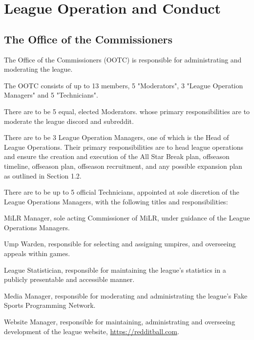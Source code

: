 
\section{League Operation and Conduct}

\subsection{The Office of the Commissioners}
\begin{deepEnumerate}
	\item The Office of the Commissioners (OOTC) is responsible for administrating and moderating the league.
	\item The OOTC consists of up to 13 members, 5 "Moderators", 3 "League Operation Managers" and 5 "Technicians".
	\begin{deepEnumerate}
		\item There are to be 5 equal, elected Moderators. whose primary responsibilities are to moderate the league discord and subreddit.
		\item There are to be 3 League Operation Managers, one of which is the Head of League Operations. Their primary responsibilities are to head league operations
		and ensure the creation and execution of the All Star Break plan, offseason timeline, offseason plan, offseason recruitment, and any possible expansion plan 
		as outlined in Section 1.2.
		\item There are to be up to 5 official Technicians, appointed at sole discretion of the League Operations Managers, with the following titles and responsibilities:
		\begin{deepEnumerate}
			\item MiLR Manager, sole acting Commissioner of MiLR, under guidance of the League Operations Managers.
			\item Ump Warden, responsible for selecting and assigning umpires, and overseeing appeals within games.
			\item League Statistician, responsible for maintaining the league's statistics in a publicly presentable and accessible manner.
			\item Media Manager, responsible for moderating and administrating the league's Fake Sports Programming Network.
			\item Website Manager, responsible for maintaining, administrating and overseeing development of the league website, \url{https://redditball.com}.
		\end{deepEnumerate}

\end{deepEnumerate}
\end{deepEnumerate}
